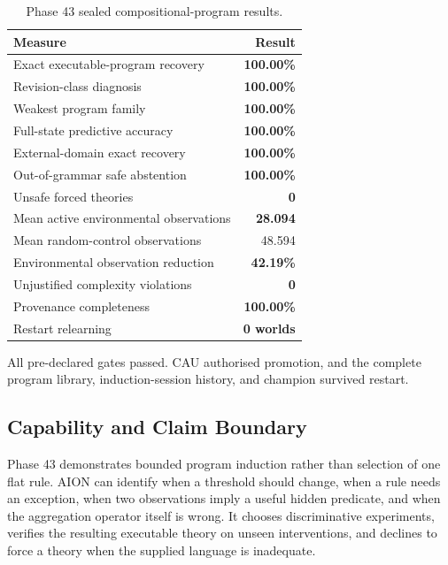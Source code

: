 \begin{table}[htbp]
  \centering
  \caption{Phase 43 sealed compositional-program results.}
  \label{tab:phase43-results}
  \begin{tabular}{lr}
    \hline
    Measure & Result \\
    \hline
    Exact executable-program recovery & \textbf{100.00\%} \\
    Revision-class diagnosis & \textbf{100.00\%} \\
    Weakest program family & \textbf{100.00\%} \\
    Full-state predictive accuracy & \textbf{100.00\%} \\
    External-domain exact recovery & \textbf{100.00\%} \\
    Out-of-grammar safe abstention & \textbf{100.00\%} \\
    Unsafe forced theories & \textbf{0} \\
    Mean active environmental observations & \textbf{28.094} \\
    Mean random-control observations & 48.594 \\
    Environmental observation reduction & \textbf{42.19\%} \\
    Unjustified complexity violations & \textbf{0} \\
    Provenance completeness & \textbf{100.00\%} \\
    Restart relearning & \textbf{0 worlds} \\
    \hline
  \end{tabular}
\end{table}

All pre-declared gates passed. CAU authorised promotion, and the complete
program library, induction-session history, and champion survived restart.

\subsection{Capability and Claim Boundary}

Phase 43 demonstrates bounded program induction rather than selection of one
flat rule. AION can identify when a threshold should change, when a rule needs
an exception, when two observations imply a useful hidden predicate, and when
the aggregation operator itself is wrong. It chooses discriminative
experiments, verifies the resulting executable theory on unseen interventions,
and declines to force a theory when the supplied language is inadequate.

